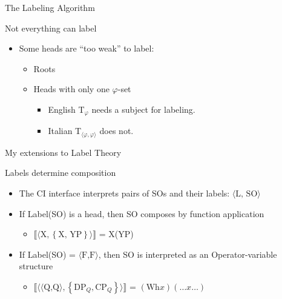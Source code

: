 \documentclass[Proposal]{subfiles}
\begin{document}
\begin{frame}
  {The Labeling Algorithm}

  \begin{block}
    {Not everything can label}
    \begin{itemize}[<+->]
      \item Some heads are ``too weak'' to label:
	\begin{itemize}
	  \item Roots
	  \item Heads with only one $\varphi$-set
	    \begin{itemize}
	      \item English T$_\varphi$ needs a subject for labeling.
	      \item Italian T$_{\langle \varphi,\varphi\rangle}$ does not.
	    \end{itemize}
	\end{itemize}
    \end{itemize}
  \end{block}
\end{frame}
\begin{frame}
  {My extensions to Label Theory}
  \begin{block}
    {Labels determine composition}
    \begin{itemize}
      \item The CI interface interprets pairs of SOs and their labels: $\langle \text{L, SO} \rangle$
      \item<2-> If Label(SO) is a head, then SO composes by function application
	\begin{itemize}
	  \item<3-> $\llbracket\langle \text{X}, \left\{ \text{X, YP} \right\}\rangle\rrbracket$ = X(YP)
	\end{itemize}
      \item<4-> If Label(SO) = $\langle\text{F,F}\rangle$, then SO is interpreted as an Operator-variable structure
	\begin{itemize}
	  \item<5-> $\llbracket\langle \langle\text{Q,Q} \rangle, \left\{ \text{DP}_Q, \text{CP}_Q \right\}\rangle\rrbracket$ = $(\text{Wh}x)(\dots x \dots)$
	\end{itemize}
    \end{itemize}
  \end{block}
\end{frame}
\end{document}
